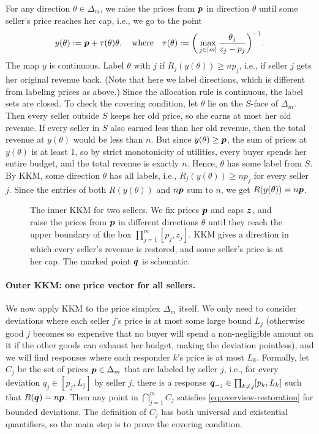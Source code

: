 For any direction $\theta \in \Delta_m$, we raise the prices from $\bm{p}$ in direction $\theta$
until some seller's price reaches her cap, i.e., we go to the point
\[ y(\theta) := \bm{p} + \tau(\theta)\theta, \quad \text{where} \quad
    \tau(\theta) := \bigg(\max_{j \in [m]} \frac{\theta_j}{z_j - p_j}\bigg)^{-1}. \]
The map $y$ is continuous.
Label $\theta$ with $j$ if $R_j(y(\theta)) \ge np_j$, i.e., if seller $j$ gets her original revenue back.
(Note that here we label directions, which is different from labeling prices as above.)
Since the allocation rule is continuous, the label sets are closed.
To check the covering condition, let $\theta$ lie on the $S$-face of $\Delta_m$.
Then every seller outside $S$ keeps her old price, so she earns at most her old revenue.
If every seller in $S$ also earned less than her old revenue,
then the total revenue at $y(\theta)$ would be less than $n$.
But since $y(\theta) \ge \bm{p}$, the sum of prices at $y(\theta)$ is at least 1,
so by strict monotonicity of utilities, every buyer spends her entire budget,
and the total revenue is exactly $n$.
Hence, $\theta$ has some label from $S$.
By KKM, some direction $\theta$ has all labels, i.e., $R_j(y(\theta)) \ge np_j$ for every seller $j$.
Since the entries of both $R(y(\theta))$ and $n\bm{p}$ sum to $n$,
we get $R(y(\theta)) = n\bm{p}$.

\begin{figure}[t]
\centering

\caption{The inner KKM for two sellers.
We fix prices $\bm{p}$ and caps $\bm{z}$, and raise the prices from $\bm{p}$ in different directions $\theta$
until they reach the upper boundary of the box $\prod_{j=1}^m [p_j, z_j]$.
KKM gives a direction in which every seller's revenue is restored,
and some seller's price is at her cap.
The marked point $\bm{q}$ is schematic.}
\label{fig:kkm-box}
\end{figure}

\paragraph{Outer KKM: one price vector for all sellers.}
We now apply KKM to the price simplex $\Delta_m$ itself.
We only need to consider deviations where each seller $j$'s price is at most some large bound $L_j$
(otherwise good $j$ becomes so expensive that no buyer will spend a non-negligible amount on it
if the other goods can exhaust her budget, making the deviation pointless),
and we will find responses where each responder $k$'s price is at most $L_k$.
Formally, let $C_j$ be the set of prices $\bm{p} \in \Delta_m$ that are labeled by seller $j$, i.e.,
for every deviation $q_j \in [p_j, L_j]$ by seller $j$,
there is a response $\bm{q}_{-j} \in \prod_{k \ne j} [p_k, L_k]$ such that $R(\bm{q}) = n\bm{p}$.
Then any point in $\bigcap_{j=1}^m C_j$ satisfies \cref{eq:overview-restoration} for bounded deviations.
The definition of $C_j$ has both universal and existential quantifiers,
so the main step is to prove the covering condition.


